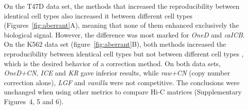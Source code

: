 \documentclass[a4,center,fleqn]{NAR}
\providecommand{\DIFadd}[1]{{\protect\color{red}#1}} %
\providecommand{\DIFdel}[1]{{\protect}}                      %
\providecommand{\DIFaddbegin}{} %
\providecommand{\DIFaddend}{} %
\providecommand{\DIFdelbegin}{} %
\providecommand{\DIFdelend}{} %
\begin{document}
\DIFadd{On the T47D data set, the methods that increased the reproducibility
between identical cell types also increased it between different cell
types }\DIFaddend (Figures~\ref{fig:aberrant}A\DIFdelbegin \DIFdel{and
\ref{fig:aberrant}B and Supplementary Figures~2 }\DIFdelend \DIFaddbegin \DIFadd{), meaning that none of them enhanced
exclusively the biological signal. However, the difference was most marked
for }\textit{\DIFadd{OneD}} \DIFaddend and \DIFdelbegin \DIFdel{3). This is an
undesirable effect, as it obscures the biological variability. Likewise, these methods decreased the similarity between samples that received the same treatment (Figure~\ref{fig:aberrant}A), suggesting that the normalization process is detrimental to the biological signal in these two
cases. The method }\textit{\DIFdel{vanilla}} %
\DIFdel{followed the same trend but to a lesser
extent, consistent with the fact that it consists of a
single }\DIFdelend \DIFaddbegin \textit{\DIFadd{caICB}}\DIFadd{. On the K562 data set
(figure~\ref{fig:aberrant}B), both methods increased the reproducibility
between identical cell types but not between different cell types
, which is the desired behavior of a
correction method. On both data sets, }\textit{\DIFadd{OneD+CN}}\DIFadd{, }\DIFaddend \textit{ICE} \DIFdelbegin \DIFdel{iteration.
}\textit{\DIFdel{OneD}} %
\DIFdel{was the only method to increase the similarity
between experiments carried out on the same material but with a different
protocol (Figure~\ref{fig:aberrant}A}\DIFdelend \DIFaddbegin \DIFadd{and
}\textit{\DIFadd{KR}} \DIFadd{gave inferior results, while }\textit{\DIFadd{raw+CN}} \DIFadd{(copy number
correction alone), }\textit{\DIFadd{LGF}} \DIFadd{and }\textit{\DIFadd{vanilla}} \DIFadd{were not competitive.
The conclusions were unchanged when using other metrics to compare Hi-C
matrices (Supplementary Figures~4, 5 and 6}\DIFaddend ).
\end{document}

